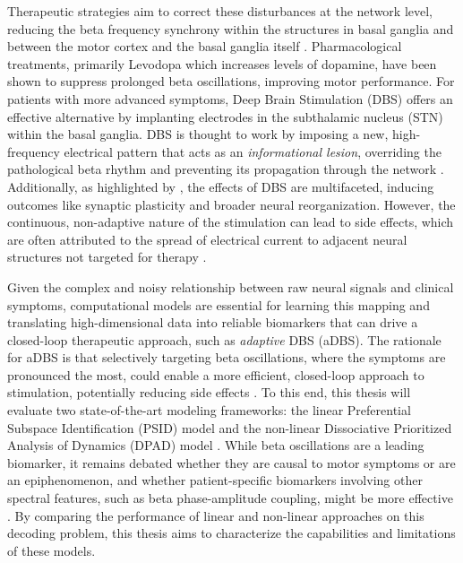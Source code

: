 \documentclass[12pt, a4paper]{article}
\begin{document}
Therapeutic strategies aim to correct these disturbances at the network level, reducing the beta frequency synchrony within the structures in basal ganglia and between the motor cortex and the basal ganglia itself \parencite{tinkhauserBetaBurstDynamics2017, paulsCorticalBetaBurst2022}. Pharmacological treatments, primarily Levodopa which increases levels of dopamine, have been shown to suppress prolonged beta oscillations, improving motor performance. For patients with more advanced symptoms, Deep Brain Stimulation (DBS) offers an effective alternative by implanting electrodes in the subthalamic nucleus (STN) within the basal ganglia. DBS is thought to work by imposing a new, high-frequency electrical pattern that acts as an \textit{informational lesion}, overriding the pathological beta rhythm and preventing its propagation through the network \parencite{chikenMechanismDeepBrain2016,mcintyreNetworkPerspectivesMechanisms2010}. Additionally, as highlighted by \textcite{wuComputationalModelsAdvance2024}, the effects of DBS are multifaceted, inducing outcomes like synaptic plasticity and broader neural reorganization. However, the continuous, non-adaptive nature of the stimulation can lead to side effects, which are often attributed to the spread of electrical current to adjacent neural structures not targeted for therapy \parencite{zarzyckiStimulationinducedSideEffects2020}.

Given the complex and noisy relationship between raw neural signals and clinical symptoms, computational models are essential for learning this mapping and translating high-dimensional data into reliable biomarkers that can drive a closed-loop therapeutic approach, such as \textit{adaptive} DBS (aDBS). The rationale for aDBS is that selectively targeting beta oscillations, where the symptoms are pronounced the most, could enable a more efficient, closed-loop approach to stimulation, potentially reducing side effects \parencite{littleAdaptiveDeepBrain2013}. To this end, this thesis will evaluate two state-of-the-art modeling frameworks: the linear Preferential Subspace Identification (PSID) model \parencite{saniModelingBehaviorallyRelevant2021} and the non-linear Dissociative Prioritized Analysis of Dynamics (DPAD) model \parencite{saniDissociativePrioritizedModeling2024}. While beta oscillations are a leading biomarker, it remains debated whether they are causal to motor symptoms or are an epiphenomenon, and whether patient-specific biomarkers involving other spectral features, such as beta phase-amplitude coupling, might be more effective \parencite{swannGammaOscillationsHyperkinetic2016, wuComputationalModelsAdvance2024}. By comparing the performance of linear and non-linear approaches on this decoding problem, this thesis aims to characterize the capabilities and limitations of these models.
\end{document}
